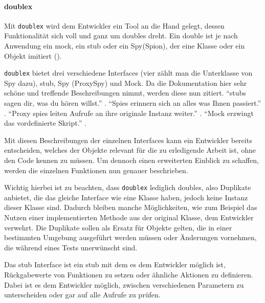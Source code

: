 \paragraph{doublex}\label{python-tools:doublex}\mbox{}
\newline
Mit \lstinline{doublex} wird dem Entwickler ein Tool an die Hand gelegt,
dessen Funktionalität sich voll und ganz um doubles dreht. Ein double ist je
nach Anwendung ein \Gls{mock}, ein \Gls{stub} oder ein Spy(Spion), der eine
Klasse oder ein Objekt imitiert (\cite{doublex:docs:1.8.1}).
\newline

\lstinline{doublex} bietet drei verschiedene Interfaces (vier zählt man die
Unterklasse von Spy dazu), \Gls{stub}, Spy (ProxySpy) und Mock. Da die
Dokumentation hier sehr schöne und treffende Beschreibungen nimmt, werden diese 
nun zitiert. "`\Glspl{stub} sagen dir, was du hören 
willst."' 
. "`Spies erinnern sich 
an alles was Ihnen passiert."' 
. "`Proxy spies leiten Aufrufe an ihre originale 
Instanz weiter."' . "`Mock 
erzwingt das vordefinierte Skript."' 
.

Mit diesen Beschreibungen der einzelnen Interfaces kann ein Entwickler bereits
entscheiden, welches der Objekte relevant für die zu erledigende Arbeit ist, 
ohne
den Code kennen zu müssen. Um dennoch einen erweiterten Einblick zu
schaffen, werden die einzelnen Funktionen nun genauer beschrieben.

Wichtig hierbei ist zu beachten, dass \lstinline{doublex} lediglich
doubles, also Duplikate anbietet, die das gleiche Interface wie eine Klasse
haben, jedoch keine Instanz dieser Klasse sind. Dadurch bleiben manche
Möglichkeiten, wie zum Beispiel das Nutzen einer
implementierten Methode aus der original Klasse, dem Entwickler verwehrt.
Die Duplikate sollen als Ersatz für Objekte gelten, die in einer bestimmten
Umgebung ausgeführt werden müssen oder Änderungen vornehmen, die während
eines Tests unerwünscht sind.
\newline

Das \Gls{stub} Interface ist ein \Gls{stub} mit dem es dem Entwickler möglich 
ist, Rückgabewerte von Funktionen zu setzen oder ähnliche Aktionen zu 
definieren. Dabei ist es dem Entwickler möglich, zwischen verschiedenen 
Parametern zu unterscheiden oder gar auf alle Aufrufe zu prüfen.


